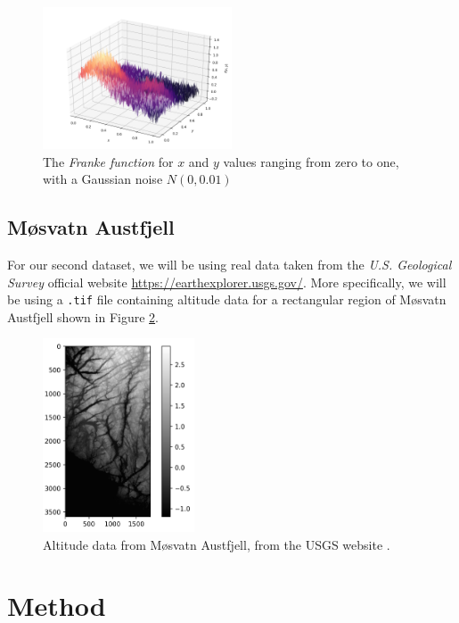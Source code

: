 \documentclass[a4paper,10pt,english]{article}
\begin{document}
\begin{figure}[H]
	\centering
	\includegraphics[width = 0.5\textwidth, center]{Franke_noise.png}
	\caption{The \textit{Franke function} for $x$ and $y$ values ranging from zero to one, with a Gaussian noise $N(0,0.01)$\label{fig_Franke_noise}}
\end{figure}

\subsection{Møsvatn Austfjell}

For our second dataset, we will be using real data taken from the \textit{U.S. Geological Survey} \cite{earthexplorer} official website \url{https://earthexplorer.usgs.gov/}.  More specifically, we will be using a \texttt{.tif} file containing altitude data for a rectangular region of Møsvatn Austfjell shown in Figure \ref{fig_austfjell}.

\begin{figure}[H]
	\centering
	\includegraphics[width = 0.4\textwidth, center]{real_data.png}
	\caption{Altitude data from Møsvatn Austfjell, from the USGS website \cite{earthexplorer}.\label{fig_austfjell}}
\end{figure}	



\section{Method}
\label{sec:method}
\end{document}
